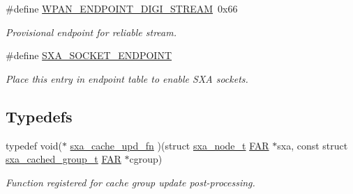 \begin{DoxyCompactItemize}
\item 
\hypertarget{group___s_x_a_ga1d3ed304c9ba526771772782f6f446e5}{\#define \hyperlink{group___s_x_a_ga1d3ed304c9ba526771772782f6f446e5}{W\-P\-A\-N\-\_\-\-E\-N\-D\-P\-O\-I\-N\-T\-\_\-\-D\-I\-G\-I\-\_\-\-S\-T\-R\-E\-A\-M}~0x66}\label{group___s_x_a_ga1d3ed304c9ba526771772782f6f446e5}

\begin{DoxyCompactList}\small\item\em Provisional endpoint for reliable stream. \end{DoxyCompactList}\item 
\#define \hyperlink{group___s_x_a_gacef6e474f41d87ead3269f543f2c5efd}{S\-X\-A\-\_\-\-S\-O\-C\-K\-E\-T\-\_\-\-E\-N\-D\-P\-O\-I\-N\-T}
\begin{DoxyCompactList}\small\item\em Place this entry in endpoint table to enable S\-X\-A sockets. \end{DoxyCompactList}\end{DoxyCompactItemize}
\subsection*{Typedefs}
\begin{DoxyCompactItemize}
\item 
typedef void($\ast$ \hyperlink{group___s_x_a_ga33ed33d7f2ab515af37029d8b4b4f449}{sxa\-\_\-cache\-\_\-upd\-\_\-fn} )(struct \hyperlink{structsxa__node__t}{sxa\-\_\-node\-\_\-t} \hyperlink{group__hal_gaef060b3456fdcc093a7210a762d5f2ed}{F\-A\-R} $\ast$sxa, const struct \hyperlink{structsxa__cached__group__t}{sxa\-\_\-cached\-\_\-group\-\_\-t} \hyperlink{group__hal_gaef060b3456fdcc093a7210a762d5f2ed}{F\-A\-R} $\ast$cgroup)
\begin{DoxyCompactList}\small\item\em Function registered for cache group update post-\/processing. \end{DoxyCompactList}\end{DoxyCompactItemize}
